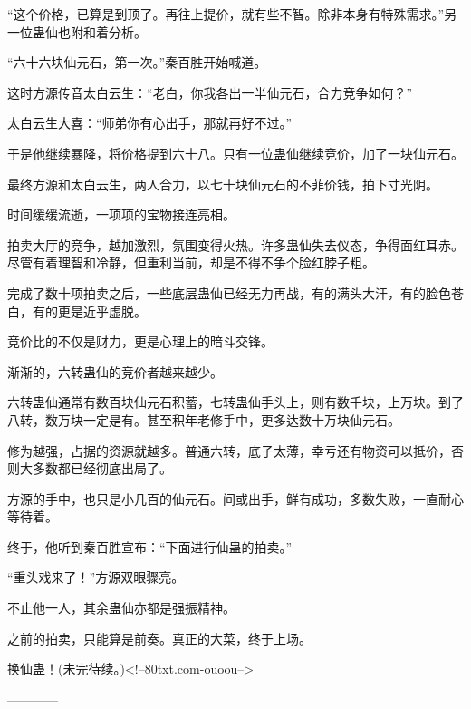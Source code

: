 \begin{this_body}
“这个价格，已算是到顶了。再往上提价，就有些不智。除非本身有特殊需求。”另一位蛊仙也附和着分析。

“六十六块仙元石，第一次。”秦百胜开始喊道。

这时方源传音太白云生：“老白，你我各出一半仙元石，合力竞争如何？”

太白云生大喜：“师弟你有心出手，那就再好不过。”

于是他继续暴降，将价格提到六十八。只有一位蛊仙继续竞价，加了一块仙元石。

最终方源和太白云生，两人合力，以七十块仙元石的不菲价钱，拍下寸光阴。

时间缓缓流逝，一项项的宝物接连亮相。

拍卖大厅的竞争，越加激烈，氛围变得火热。许多蛊仙失去仪态，争得面红耳赤。尽管有着理智和冷静，但重利当前，却是不得不争个脸红脖子粗。

完成了数十项拍卖之后，一些底层蛊仙已经无力再战，有的满头大汗，有的脸色苍白，有的更是近乎虚脱。

竞价比的不仅是财力，更是心理上的暗斗交锋。

渐渐的，六转蛊仙的竞价者越来越少。

六转蛊仙通常有数百块仙元石积蓄，七转蛊仙手头上，则有数千块，上万块。到了八转，数万块一定是有。甚至积年老修手中，更多达数十万块仙元石。

修为越强，占据的资源就越多。普通六转，底子太薄，幸亏还有物资可以抵价，否则大多数都已经彻底出局了。

方源的手中，也只是小几百的仙元石。间或出手，鲜有成功，多数失败，一直耐心等待着。

终于，他听到秦百胜宣布：“下面进行仙蛊的拍卖。”

“重头戏来了！”方源双眼骤亮。

不止他一人，其余蛊仙亦都是强振精神。

之前的拍卖，只能算是前奏。真正的大菜，终于上场。

换仙蛊！(未完待续。)<!--80txt.com-ouoou-->

------------

\end{this_body}

